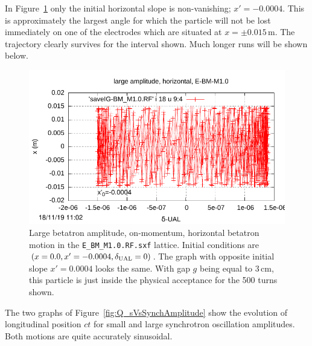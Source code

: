 \documentclass[]{article}
\begin{document}
In Figure~\ref{fig:PureBetatron_BM_Z} only 
the initial horizontal slope is non-vanishing; $x'=-0.0004$. 
This is approximately the largest angle for which the
particle will not be lost immediately on one of the electrodes
which are situated at $x=\pm0.015\,$m.
The trajectory clearly survives for the interval shown.
Much longer runs will be shown below.

%
\begin{figure}[h]
\begin{minipage}[b]{\linewidth}
\centering
\includegraphics[scale=0.8]{pdf/BM-III_Figure11.pdf}
\end{minipage}
\caption{\label{fig:PureBetatron_BM_Z}Large betatron amplitude,
on-momentum, horizontal betatron motion 
in the {\tt E\_BM\_M1.0.RF.sxf} lattice. 
Initial conditions are $(x=0.0,x'=-0.0004,\delta_{\rm UAL}=0)$.
The graph with opposite initial slope $x'=0.0004$ looks the same.
With gap $g$ being equal to 3\,cm,
this particle is just inside the physical acceptance for
the 500 turns shown.
}
\end{figure}
%
The two graphs of Figure~\ref{fig:Q_sVsSynchAmplitude} 
show the evolution of longitudinal position $ct$ for small
and large synchrotron oscillation amplitudes. Both
motions are quite accurately sinusoidal.
%
\end{document}

